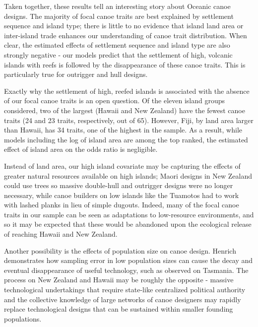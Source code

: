 Taken together, these results tell an interesting story about Oceanic canoe designs.  The majority of focal canoe traits are best explained by settlement sequence and island type; there is little to no evidence that island land area or inter-island trade enhances our understanding of canoe trait distribution.  When clear, the estimated effects of settlement sequence and island type are also strongly negative - our models predict that the settlement of high, volcanic islands with reefs is followed by the disappearance of these canoe traits.  This is particularly true for outrigger and hull designs.    

Exactly why the settlement of high, reefed islands is associated with the absence of our focal canoe traits is an open question.  Of the eleven island groups considered, two of the largest (Hawaii and New Zealand) have the fewest canoe traits (24 and 23 traits, respectively, out of 65).  However, Fiji, by land area larger than Hawaii, has 34 traits, one of the highest in the sample.  As a result, while models including the log of island area are among the top ranked, the estimated effect of island area on the odds ratio is negligible.

Instead of land area, our high island covariate may be capturing the effects of greater natural resources available on high islands; Maori designs in New Zealand could use trees so massive double-hull and outrigger designs were no longer necessary, while canoe builders on low islands like the Tuamotos had to work with lashed planks in lieu of simple dugouts.  Indeed, many of the focal canoe traits in our sample can be seen as adaptations to low-resource environments, and so it may be expected that these would be abandoned upon the ecological release of reaching Hawaii and New Zealand.  

Another possibility is the effects of population size on canoe design.  Henrich \citep{Henrich2004:Tasmania} demonstrates how sampling error in low population sizes can cause the decay and eventual disappearance of useful technology, such as observed on Tasmania.  The process on New Zealand and Hawaii may be roughly the opposite - massive technological undertakings that require state-like centralized political authority and the collective knowledge of large networks of canoe designers may rapidly replace technological designs that can be sustained within smaller founding populations.  

